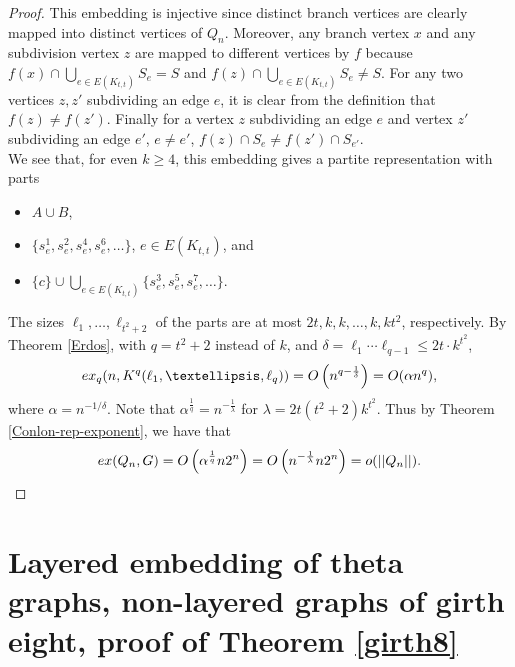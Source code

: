\documentclass[11pt, a4paper]{article}
\newcommand{\ex}{{\rm  ex}}
\begin{document}
\begin{proof}
 
This embedding is injective since distinct branch vertices are clearly mapped into distinct vertices of $Q_n$. Moreover, any branch vertex $x$ and any subdivision vertex $z$ are mapped to different vertices by $f$ because $f(x) \cap \bigcup_{e\in E(K_{t,t})} S_e = S$ and $f(z)  \cap \bigcup_{e\in E(K_{t,t})} S_e \neq S$.
For any two vertices $z, z'$ subdividing an edge $e$, it is clear from the definition that $f(z)\neq f(z')$. 
Finally for a vertex $z$ subdividing an edge $e$ and vertex $z'$ subdividing an edge $e'$,  $e\neq e'$, $f(z) \cap S_e \neq f(z') \cap S_{e'}$.\\


We see that, for even $k\geq 4$,  this embedding gives a partite representation with parts
\begin{itemize}
\item{}
$A\cup B$, 
\item{} $\{s_e^1, s_e^2, s_e^4, s_e^6, \ldots \}$, $e\in E(K_{t,t})$, and 
\item{} 
$\{c\} \cup   \bigcup_{e\in E(K_{t,t})} \{s_e^3, s_e^5, s_e^7, \ldots\}.$
\end{itemize}

The sizes  $\ell_1, \ldots, \ell_{t^2+2}$ of the parts are at most $2t, k, k, \ldots, k, kt^2$, respectively.
By  Theorem \ref{Erdos}, with $q= t^2+2$ instead of $k$, and $\delta = \ell_1 \cdots \ell_{q-1} \leq 2t\cdot k^{t^2}$,   $$\ex_{q}(n, K^{q}(\ell_1, \ldots, \ell_{q})) = O\left(n^{q - \frac{1}{\delta}}\right) = O(\alpha n^{q}),$$ 
where  $\alpha =  n^{-1/\delta}.$ Note that $\alpha^{\frac{1}{q}}=n^{-\frac{{1}}{\lambda}}$ for $\lambda=2t(t^2+2)k^{t^2}$.
Thus by Theorem \ref{Conlon-rep-exponent}, we have that  $$\ex(Q_n, G) =  O\left(\alpha^{\frac{1}{q}} n2^n\right)=  O\left(n^{-\frac{{1}}{\lambda}} n2^n\right) = o(||Q_n||).$$
\end{proof}	
	
	
	
	
	
		
\section{Layered embedding of  theta graphs, non-layered graphs of girth eight, proof of Theorem \ref{girth8}}	\label{girth}
\end{document}
